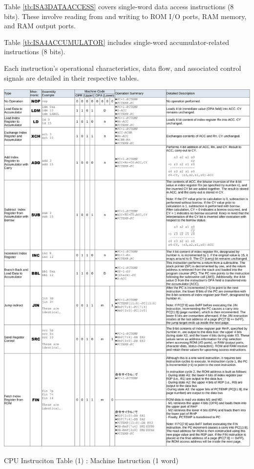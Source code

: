 Table \ref{tb:ISA3DATAACCESS} covers single-word data access instructions (8 bits). These involve reading from and writing to ROM I/O ports, RAM memory, and RAM output ports.

Table \ref{tb:ISA4ACCUMULATOR} includes single-word accumulator-related instructions (8 bits).

Each instruction's operational characteristics, data flow, and associated control signals are detailed in their respective tables.

\begin{table}[htbp]
    \includegraphics[width=1.00\columnwidth]{./Table/ISA(1)Machine(1word).pdf}
    \caption{CPU Instruciton Table (1) : Machine Instruction (1 word)}
    \label{tb:ISA1MACHINE1WORD}
\end{table}
